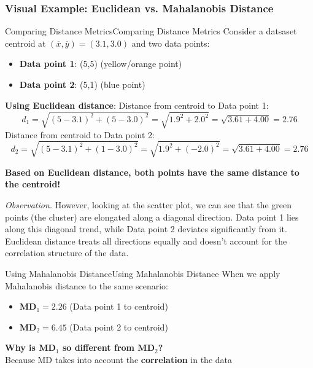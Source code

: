 \documentclass[a4paper]{article}
\theoremstyle{definition}
\begin{document}
\subsubsection{Visual Example: Euclidean vs. Mahalanobis Distance}
\begin{example}{Comparing Distance Metrics}{Comparing Distance Metrics}
Consider a datsaset centroid at \( (\overline{x}, \overline{y}) = (3.1,3.0) \) and two data points:
\begin{itemize}
    \item \textbf{Data point 1}: (5,5) (yellow/orange point)
    \item \textbf{Data point 2}: (5,1) (blue point)
\end{itemize}
\textbf{Using Euclidean distance}:
\vspace{1em}
\noindent
\newline
Distance from centroid to Data point 1:
\[
  d_1 = \sqrt{(5 - 3.1)^2 + (5 - 3.0)^2} = \sqrt{1.9^2 + 2.0^2} = \sqrt{3.61 + 4.00} = 2.76
\]
Distance from centroid to Data point 2:
\[
  d_2 = \sqrt{(5 - 3.1)^2 + (1 - 3.0)^2} = \sqrt{1.9^2 + (-2.0)^2} = \sqrt{3.61 + 4.00} = 2.76
\]
\end{example}
\begin{tcolorbox}[
    colback=magenta!15!white,
    colframe=magenta!15!white,
    boxrule=0pt,
    arc=0pt,
    halign=center
]
    \textbf{Based on Euclidean distance, both points have the same distance to the centroid!}
\end{tcolorbox}
\textit{Observation.} However, looking at the scatter plot, we can see that the green points (the cluster)
are elongated along a diagonal direction. Data point 1 lies along this diagonal trend, while Data point 2 
deviates significantly from it.
\vspace{1em}
\noindent
\newline
Euclidean distance treats all directions equally and doesn't account for the correlation structure of the data.
\begin{example}{Using Mahalanobis Distance}{Using Mahalanobis Distance}
When we apply Mahalanobis distance to the same scenario:
\begin{itemize}
    \item \( \mathbf{MD}_1 = \mathbf{2.26} \) (Data point 1 to centroid)
    \item \( \mathbf{MD}_2 = \mathbf{6.45} \) (Data point 2 to centroid)
\end{itemize}
\end{example}
\begin{tcolorbox}[
    colback=orange!15!white,
    colframe=orange!15!white,
    boxrule=0pt,
    arc=0pt,
    halign=center
]
    \textbf{Why is \( \textbf{MD}_1 \) so different from \( \textbf{MD}_2 \)?}\\[0.6em]
    Because MD takes into account the \textbf{correlation} in the data
\end{tcolorbox}
\end{document}
